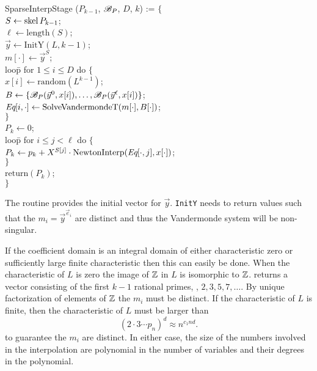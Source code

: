 \begindsacode
SparseInterpStage ($P_{k-1}$, ${\cal B}_P$, $D$, $k$) := $\{$ \\
\> $S \leftarrow \mathop{\rm skel}\nolimits P_{k-1}$; \\
\> $\ell \leftarrow \mbox{length}(S)$; \\
\> $\vec{y} \leftarrow \mbox{InitY}(L, k - 1)$; \\
\> $m[\cdot] \leftarrow \vec{y}^S$; \\
\> loo\=p for $1 \le i \le D$ do $\{$ \\
\>\> $x[i] \leftarrow \mbox{random}(L^{k-1})$; \\
\>\> $B \leftarrow \{{\cal B}_P(\vec{y}^0, x[i]), \ldots, 
  {\cal B}_P(\vec{y}^{\ell}, x[i])\}$; \\
\>\> $\mbox{\em Eq}[i, \cdot] \leftarrow \mbox{SolveVandermondeT}(m[\cdot], B[\cdot])$;\\
\>\> $\}$ \\
\> $P_k \leftarrow 0$; \\
\> loo\=p for $i \le j < \ell$ do $\{$\\
\>\> $P_k \leftarrow p_k + X^{S[j]} \cdot \mbox{NewtonInterp}(\mbox{\em Eq}[\cdot,
j], x[\cdot])$;\\
\>\> $\}$ \\
\> $\mbox{return}(P_k)$; \\
\> $\}$
\enddsacode

\noindent
The routine  provides the initial vector for $\vec{y}$.
{\tt InitY} needs to return values such that the $m_i =
\vec{y}^{\vec{e}_i}$ are distinct and thus the Vandermonde system will
be non-singular.

If the coefficient domain is an integral domain of either
characteristic zero or sufficiently large finite characteristic then
this can easily be done.  When the characteristic of $L$ is zero
the image of $\mathbb{Z}$ in $L$ is isomorphic to
$\mathbb{Z}$.   returns a vector consisting of the first $k-1$
rational primes, \ie, $2, 3, 5, 7, \ldots$.  By unique factorization
of elements of $\mathbb{Z}$ the $m_i$ must be distinct.  If the characteristic
of $L$ is finite, then the characteristic of $L$ must be larger than 
\begin{equation} \label{SI:FFBound:Eq}
(2 \cdot 3 \cdots p_n)^d \approx n^{c_1 nd}.
\end{equation}
to guarantee the $m_i$ are distinct.  In either case, the size of the
numbers involved in the interpolation are polynomial in the number
of variables and their degrees in the polynomial.

